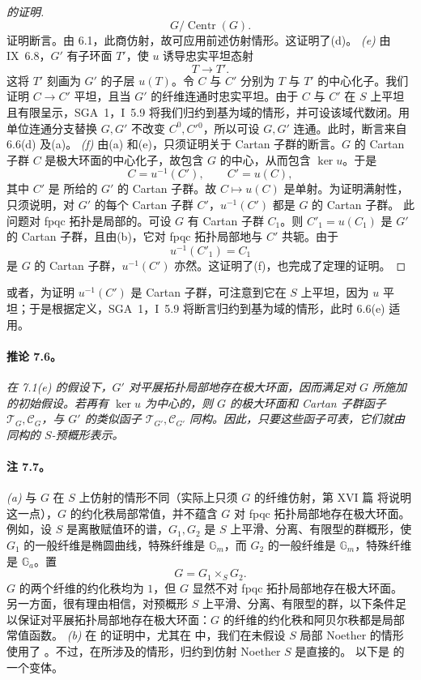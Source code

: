 \begin{proof}[ 的证明]
\[
  G/\operatorname{Centr}(G).
\]
证明断言。由 6.1，此商仿射，故可应用前述仿射情形。这证明了\textup{(d)}。
\emph{(e)} 由 IX~6.8，\(G'\) 有子环面 \(T'\)，使 \(u\) 诱导忠实平坦态射
\[
  T\longrightarrow T'.
\]
这将 \(T'\) 刻画为 \(G'\) 的子层 \(u(T)\)。令 \(C\) 与 \(C'\) 分别为 \(T\) 与 \(T'\) 的中心化子。我们证明 \(C\to C'\) 平坦，且当 \(G'\) 的纤维连通时忠实平坦。由于 \(C\) 与 \(C'\) 在 \(S\) 上平坦且有限呈示，SGA~1，I~5.9 将我们归约到基为域的情形，并可设该域代数闭。用单位连通分支替换 \(G,G'\) 不改变 \(C^0,C'{}^0\)，所以可设 \(G,G'\) 连通。此时，断言来自 6.6(d) 及\textup{(a)}。
\emph{(f)} 由\textup{(a)} 和\textup{(e)}，只须证明关于 Cartan 子群的断言。\(G\) 的 Cartan 子群 \(C\) 是极大环面的中心化子，故包含 \(G\) 的中心，从而包含 \(\ker u\)。于是
\[
  C=u^{-1}(C'),
  \qquad C'=u(C),
\]
其中 \(C'\) 是\textup{} 所给的 \(G'\) 的 Cartan 子群。故 \(C\mapsto u(C)\) 是单射。为证明满射性，只须说明，对 \(G'\) 的每个 Cartan 子群 \(C'\)，\(u^{-1}(C')\) 都是 \(G\) 的 Cartan 子群。
此问题对 fpqc 拓扑是局部的。可设 \(G\) 有 Cartan 子群 \(C_1\)。则 \(C'_1=u(C_1)\) 是 \(G'\) 的 Cartan 子群，且由\textup{(b)}，它对 fpqc 拓扑局部地与 \(C'\) 共轭。由于
\[
  u^{-1}(C'_1)=C_1
\]
是 \(G\) 的 Cartan 子群，\(u^{-1}(C')\) 亦然。这证明了\textup{(f)}，也完成了定理的证明。
\end{proof}
或者，为证明 \(u^{-1}(C')\) 是 Cartan 子群，可注意到它在 \(S\) 上平坦，因为 \(u\) 平坦；于是根据定义，SGA~1，I~5.9 将断言归约到基为域的情形，此时 6.6(e) 适用。
\paragraph{\textbf{推论 7.6。}}
\emph{在 7.1\textup{(e)} 的假设下，\(G'\) 对平展拓扑局部地存在极大环面，因而满足对 \(G\) 所施加的初始假设。若再有 \(\ker u\) 为中心的，则 \(G\) 的极大环面和 Cartan 子群函子 \(\mathcal T_G,\mathcal C_G\)，与 \(G'\) 的类似函子 \(\mathcal T_{G'},\mathcal C_{G'}\) 同构。因此，只要这些函子可表，它们就由同构的 \(S\)-预概形表示。}
\paragraph{\textbf{注 7.7。}}
\emph{(a)} 与 \(G\) 在 \(S\) 上仿射的情形不同（实际上只须 \(G\) 的纤维仿射，第 XVI 篇 将说明这一点），\(G\) 的约化秩局部常值，并不蕴含 \(G\) 对 fpqc 拓扑局部地存在极大环面。例如，设 \(S\) 是离散赋值环的谱，\(G_1,G_2\) 是 \(S\) 上平滑、分离、有限型的群概形，使 \(G_1\) 的一般纤维是椭圆曲线，特殊纤维是 \(\mathbb G_m\)，而 \(G_2\) 的一般纤维是 \(\mathbb G_m\)，特殊纤维是 \(\mathbb G_a\)。置
\[
  G=G_1\times_S G_2.
\]
\(G\) 的两个纤维的约化秩均为 \(1\)，但 \(G\) 显然不对 fpqc 拓扑局部地存在极大环面。
另一方面，很有理由相信，对预概形 \(S\) 上平滑、分离、有限型的群，以下条件足以保证对平展拓扑局部地存在极大环面：\(G\) 的纤维的约化秩和阿贝尔秩都是局部常值函数。
\emph{(b)} 在  的证明中，尤其在\textup{} 中，我们在未假设 \(S\) 局部 Noether 的情形使用了 。不过，在所涉及的情形，归约到仿射 Noether \(S\) 是直接的。
以下是  的一个变体。
